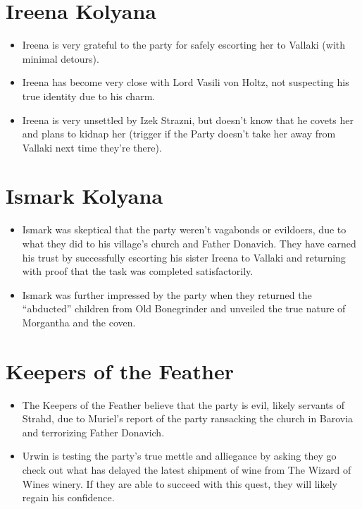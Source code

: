 \documentclass[a4paper,11pt]{article}
\begin{document}
\section{Ireena Kolyana}
\begin{itemize}
  \item Ireena is very grateful to the party for safely escorting her to Vallaki (with minimal detours).
  \item Ireena has become very close with Lord Vasili von Holtz, not suspecting his true identity due to his 
  charm.
  \item Ireena is very unsettled by Izek Strazni, but doesn't know that he covets her and plans to kidnap her 
  (trigger if the Party doesn't take her away from Vallaki next time they're there).
\end{itemize}

\section{Ismark Kolyana}
\begin{itemize}
  \item Ismark was skeptical that the party weren't vagabonds or evildoers, due to what they did to his village's 
  church and Father Donavich. They have earned his trust by successfully escorting his sister Ireena to Vallaki 
  and returning with proof that the task was completed satisfactorily.
  \item Ismark was further impressed by the party when they returned the ``abducted'' children from Old 
  Bonegrinder and unveiled the true nature of Morgantha and the coven.
\end{itemize}

\section{Keepers of the Feather}
\begin{itemize}
  \item The Keepers of the Feather believe that the party is evil, likely servants of Strahd, due to Muriel's 
  report of the party ransacking the church in Barovia and terrorizing Father Donavich.
  \item Urwin is testing the party's true mettle and alliegance by asking they go check out what has delayed the
  latest shipment of wine from The Wizard of Wines winery. If they are able to succeed with this quest, they
  will likely regain his confidence.
\end{itemize}
\end{document}
